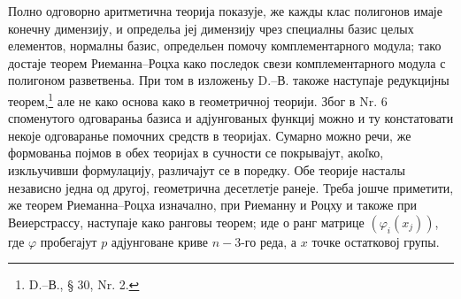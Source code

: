 ﻿\documentclass[11pt]{article}
\begin{document}
Полно одговорно аритметична теорија показује, же кажды клас полигонов имаје конечну димензију, и определьа јеј димензију чрез специалны базис целых елементов, нормалны базис, определьен помочу комплементарного модула; тако достаје теорем Риеманна--Роцха како последок свези комплементарного модула с полигоном разветвеньа. При том в изложеньу D.--В. такоже наступаје редукцијны теорем,\footnote{D.--В., § 30, Nr. 2.} але не како основа како в геометричној теорији. Због в Nr. 6 споменутого одговараньа базиса и адјунгованых функциј можно и ту констатовати некоје одговаранье помочних средств в теоријах. Сумарно можно речи, же формованьа појмов в обех теоријах в сучности се покрывајут, акоľко, изкльучивши формулацију, различајут се в поредку. Обе теорије насталы независно једна од другој, геометрична десетлетје ранеје. Треба јошче приметити, же теорем Риеманна--Роцха изначално, при Риеманну и Роцху и такоже при Веиерстрассу, наступаје како ранговы теорем; иде о ранг матрице \((\varphi_i(x_j))\), где \(\varphi\) пробегајут \(p\) адјунговане криве \(n-3\)-го реда, а \(x\) точке остатковој групы.
\end{document}
